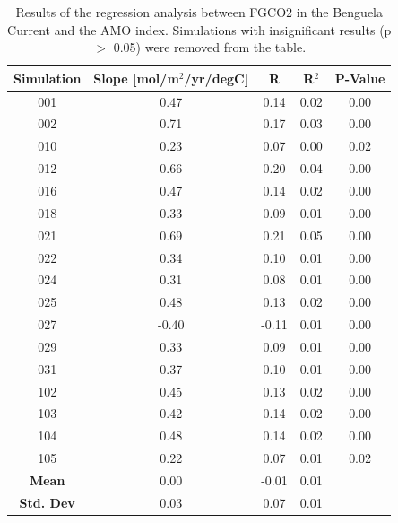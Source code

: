 \documentclass[12pt]{article}
\begin{document}
\begin{table}[p!]
	\centering
	\caption{Results of the regression analysis between FGCO2 in the Benguela Current and the AMO index. Simulations with insignificant results (p $>$ 0.05) were removed from the table.}
\begin{tabular}{c | c c c c}
	\toprule
	\textbf{Simulation} &  \textbf{Slope} [mol/m$^{2}$/yr/degC] &  \textbf{R} &  \textbf{R$^{2}$} & P-Value \\
	\midrule
	001 &   0.47 &     0.14 &       0.02 &     0.00 \\
	002 &   0.71 &     0.17 &       0.03 &     0.00 \\
	010 &   0.23 &     0.07 &       0.00 &     0.02 \\
	012 &   0.66 &     0.20 &       0.04 &     0.00 \\
	016 &   0.47 &     0.14 &       0.02 &     0.00 \\
	018 &   0.33 &     0.09 &       0.01 &     0.00 \\
	021 &   0.69 &     0.21 &       0.05 &     0.00 \\
	022 &   0.34 &     0.10 &       0.01 &     0.00 \\
	024 &   0.31 &     0.08 &       0.01 &     0.00 \\
	025 &   0.48 &     0.13 &       0.02 &     0.00 \\
	027 &  -0.40 &    -0.11 &       0.01 &     0.00 \\
	029 &   0.33 &     0.09 &       0.01 &     0.00 \\
	031 &   0.37 &     0.10 &       0.01 &     0.00 \\
	102 &   0.45 &     0.13 &       0.02 &     0.00 \\
	103 &   0.42 &     0.14 &       0.02 &     0.00 \\
	104 &   0.48 &     0.14 &       0.02 &     0.00 \\
	105 &   0.22 &     0.07 &       0.01 &     0.02 \\
	\bottomrule
	\textbf{Mean} & 0.00 & -0.01 & 0.01 & \\
	\textbf{Std. Dev} & 0.03 & 0.07 & 0.01 & \\
\end{tabular}
	\label{tab:bencs:amo}
	
\end{table}

\clearpage

\end{document}
